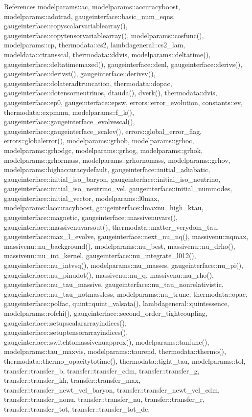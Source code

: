 References modelparams\+::ac, modelparams\+::accuracyboost, modelparams\+::adotrad, gaugeinterface\+::basic\+\_\+num\+\_\+eqns, gaugeinterface\+::copyscalarvariablearray(), gaugeinterface\+::copytensorvariablearray(), modelparams\+::cosfunc(), modelparams\+::cp, thermodata\+::cs2, lambdageneral\+::cs2\+\_\+lam, modeldata\+::ctransscal, thermodata\+::ddvis, modelparams\+::deltatime(), gaugeinterface\+::deltatimemaxed(), gaugeinterface\+::denl, gaugeinterface\+::derivs(), gaugeinterface\+::derivst(), gaugeinterface\+::derivsv(), gaugeinterface\+::dolateradtruncation, thermodata\+::dopac, gaugeinterface\+::dotensorneutrinos, dtauda(), dverk(), thermodata\+::dvis, gaugeinterface\+::ep0, gaugeinterface\+::epsw, errors\+::error\+\_\+evolution, constants\+::ev, thermodata\+::expmmu, modelparams\+::f\+\_\+k(), gaugeinterface\+::gaugeinterface\+\_\+evolvescal(), gaugeinterface\+::gaugeinterface\+\_\+scalev(), errors\+::global\+\_\+error\+\_\+flag, errors\+::globalerror(), modelparams\+::grhob, modelparams\+::grhoc, modelparams\+::grhodgc, modelparams\+::grhog, modelparams\+::grhok, modelparams\+::grhormass, modelparams\+::grhornomass, modelparams\+::grhov, modelparams\+::highaccuracydefault, gaugeinterface\+::initial\+\_\+adiabatic, gaugeinterface\+::initial\+\_\+iso\+\_\+baryon, gaugeinterface\+::initial\+\_\+iso\+\_\+neutrino, gaugeinterface\+::initial\+\_\+iso\+\_\+neutrino\+\_\+vel, gaugeinterface\+::initial\+\_\+nummodes, gaugeinterface\+::initial\+\_\+vector, modelparams\+::l0max, modelparams\+::laccuracyboost, gaugeinterface\+::lmaxnu\+\_\+high\+\_\+ktau, gaugeinterface\+::magnetic, gaugeinterface\+::massivenuvars(), gaugeinterface\+::massivenuvarsout(), thermodata\+::matter\+\_\+verydom\+\_\+tau, gaugeinterface\+::max\+\_\+l\+\_\+evolve, gaugeinterface\+::next\+\_\+nu\+\_\+nq(), massivenu\+::nqmax, massivenu\+::nu\+\_\+background(), modelparams\+::nu\+\_\+best, massivenu\+::nu\+\_\+drho(), massivenu\+::nu\+\_\+int\+\_\+kernel, gaugeinterface\+::nu\+\_\+integrate\+\_\+l012(), gaugeinterface\+::nu\+\_\+intvsq(), modelparams\+::nu\+\_\+masses, gaugeinterface\+::nu\+\_\+pi(), gaugeinterface\+::nu\+\_\+pinudot(), massivenu\+::nu\+\_\+q, massivenu\+::nu\+\_\+rho(), gaugeinterface\+::nu\+\_\+tau\+\_\+massive, gaugeinterface\+::nu\+\_\+tau\+\_\+nonrelativistic, gaugeinterface\+::nu\+\_\+tau\+\_\+notmassless, modelparams\+::nu\+\_\+trunc, thermodata\+::opac, gaugeinterface\+::polfac, quint\+::quint\+\_\+valsata(), lambdageneral\+::quintessence, modelparams\+::rofchi(), gaugeinterface\+::second\+\_\+order\+\_\+tightcoupling, gaugeinterface\+::setupscalararrayindices(), gaugeinterface\+::setuptensorarrayindices(), gaugeinterface\+::switchtomassivenuapprox(), modelparams\+::tanfunc(), modelparams\+::tau\+\_\+maxvis, modelparams\+::taurend, thermodata\+::thermo(), thermodata\+::thermo\+\_\+opacitytotime(), thermodata\+::tight\+\_\+tau, modelparams\+::tol, transfer\+::transfer\+\_\+b, transfer\+::transfer\+\_\+cdm, transfer\+::transfer\+\_\+g, transfer\+::transfer\+\_\+kh, transfer\+::transfer\+\_\+max, transfer\+::transfer\+\_\+newt\+\_\+vel\+\_\+baryon, transfer\+::transfer\+\_\+newt\+\_\+vel\+\_\+cdm, transfer\+::transfer\+\_\+nonu, transfer\+::transfer\+\_\+nu, transfer\+::transfer\+\_\+r, transfer\+::transfer\+\_\+tot, transfer\+::transfer\+\_\+tot\+\_\+de, 